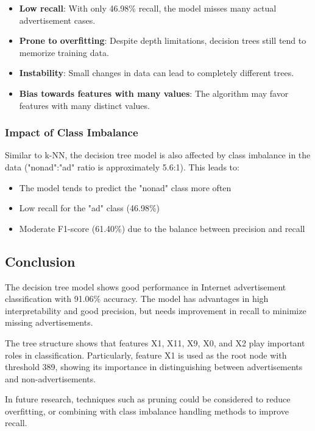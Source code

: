 \begin{itemize}
    \item \textbf{Low recall}: With only 46.98\% recall, the model misses many actual advertisement cases.
    \item \textbf{Prone to overfitting}: Despite depth limitations, decision trees still tend to memorize training data.
    \item \textbf{Instability}: Small changes in data can lead to completely different trees.
    \item \textbf{Bias towards features with many values}: The algorithm may favor features with many distinct values.
\end{itemize}

\subsubsection{Impact of Class Imbalance}

Similar to k-NN, the decision tree model is also affected by class imbalance in the data ("nonad":"ad" ratio is approximately 5.6:1). This leads to:

\begin{itemize}
    \item The model tends to predict the "nonad" class more often
    \item Low recall for the "ad" class (46.98\%)
    \item Moderate F1-score (61.40\%) due to the balance between precision and recall
\end{itemize}

\subsection{Conclusion}

The decision tree model shows good performance in Internet advertisement classification with 91.06\% accuracy. The model has advantages in high interpretability and good precision, but needs improvement in recall to minimize missing advertisements.

The tree structure shows that features X1, X11, X9, X0, and X2 play important roles in classification. Particularly, feature X1 is used as the root node with threshold 389, showing its importance in distinguishing between advertisements and non-advertisements.

In future research, techniques such as pruning could be considered to reduce overfitting, or combining with class imbalance handling methods to improve recall.